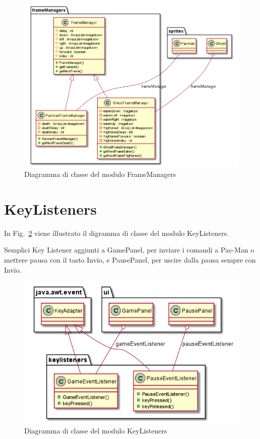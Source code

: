 \documentclass[12pt,a4paper]{report}
\begin{document}
\begin{figure}[tb]
\begin{center}
  \includegraphics[width=15cm]{frameManagers}
\end{center}
  \caption{Diagramma di classe del modulo FrameManagers}
  \label{fig:frameManagers}
\end{figure}


\section{KeyListeners}\label{se:arch.keyListeners}
In Fig.~\ref{fig:keyListeners} viene illustrato il digramma di classe del modulo KeyListeners.\newline

Semplici Key Listener aggiunti a GamePanel, per inviare i comandi a Pac-Man o mettere pausa con il tasto Invio, e PausePanel, per uscire dalla pausa sempre con Invio. \newpage

\begin{figure}[tb]
\begin{center}
  \includegraphics[width=12cm]{keyListeners}
\end{center}
  \caption{Diagramma di classe del modulo KeyListeners}
  \label{fig:keyListeners}
\end{figure}
\end{document}
